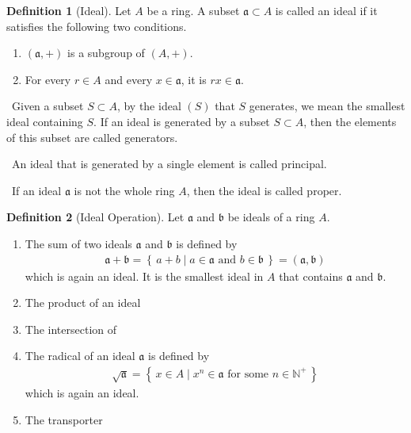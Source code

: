 \documentclass[a4paper]{book}
\theoremstyle{definition}
\newtheorem{definition}{Definition}[]
\newcommand{\makeset}[2]{\left\{\, #1 \mid #2 \,\right\}}
\begin{document}
\begin{defbox}
    \begin{definition}[Ideal]
        Let \(A\) be a ring. A subset \(\mathfrak{a} \subset A\) is called an ideal if it satisfies the following two conditions.
        \begin{enumerate}
            \item \((\mathfrak{a}, +)\) is a subgroup of \((A, +)\).
            \item For every \(r \in A\) and every \(x \in \mathfrak{a}\), it is \(rx \in \mathfrak{a}\).
        \end{enumerate}
        \
        Given a subset \(S \subset A\), by the ideal \((S)\) that \(S\) generates, we mean the smallest ideal containing \(S\). If an ideal is generated by a subset \(S \subset A\), then the elements of this subset are called generators.

        \
        An ideal that is generated by a single element is called principal.

        \
        If an ideal \(\mathfrak{a}\) is not the whole ring \(A\), then the ideal is called proper.
    \end{definition}
\end{defbox}

\begin{defbox}
    \begin{definition}[Ideal Operation]
        Let \(\mathfrak{a}\) and \(\mathfrak{b}\) be ideals of a ring \(A\).
        \begin{enumerate}
            \item The sum of two ideals \(\mathfrak{a}\) and \(\mathfrak{b}\) is defined by
            \begin{align*}
                \mathfrak{a} + \mathfrak{b} = \makeset{a + b}{a \in \mathfrak{a} \text{ and } b \in \mathfrak{b}} = (\mathfrak{a}, \mathfrak{b})
            \end{align*}
            which is again an ideal. It is the smallest ideal in \(A\) that contains \(\mathfrak{a}\) and \(\mathfrak{b}\).
            \item The product of an ideal
            \item The intersection of
            \item The radical of an ideal \(\mathfrak{a}\) is defined by
            \begin{align*}
                \sqrt{\mathfrak{a}} = \makeset{x \in A}{x^n \in \mathfrak{a} \text{ for some } n \in \mathbb{N}^+}
            \end{align*}
            which is again an ideal.
            \item The transporter
        \end{enumerate}
    \end{definition}
\end{defbox}
\end{document}
